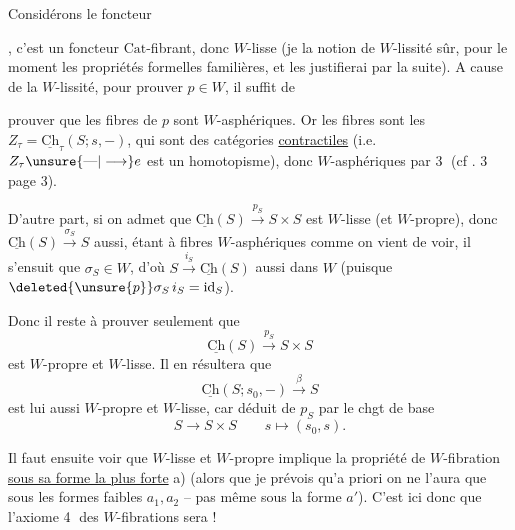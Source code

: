 Considérons le foncteur

, c'est un foncteur $\mathrm{Cat}$-fibrant, donc $W$-lisse (je   la notion de $W$-lissité  sûr,   pour le moment les propriétés formelles familières, et les justifierai par la suite). A cause de la $W$-lissité, pour prouver $p\in W$, il suffit de



prouver que les fibres de $p$ sont $W$-asphériques. Or les fibres sont les $Z_\tau=\underline{\mathrm{Ch}}_\tau(S;s,-)$, qui sont des catégories \uline{contractiles} (i.e. $Z_\tau\unsure{\text{---}|\longrightarrow}e$ est un homotopisme), donc $W$-asphériques par \textcircled{3} (cf . 3 page 3).

D'autre part,  si on admet que $\underline{\mathrm{Ch}}(S)\xrightarrow{p_S}S\times S$ est $W$-lisse (et $W$-propre), donc $\underline{\mathrm{Ch}}(S)\xrightarrow{\sigma_S}S$ aussi, étant à fibres $W$-asphériques comme on vient de voir, il s'ensuit que $\sigma_S\in W$, d'où $S\xrightarrow{i_S}\underline{\mathrm{Ch}}(S)$ aussi dans $W$ (puisque $\deleted{\unsure{p}}\sigma_S\,i_S=\mathrm{id}_S$).


Donc il reste à prouver seulement que
\[
\underline{\mathrm{Ch}}(S)\xrightarrow{p_S}S\times S \tag*{(a)}
\]
est $W$-propre et $W$-lisse. Il en résultera que
\[
\underline{\mathrm{Ch}}(S;s_0,-)\xrightarrow{\beta}S
\]
est lui aussi $W$-propre et $W$-lisse, car déduit de $p_S$ par le chgt de base
\[
S\longrightarrow S\times S\qquad s\longmapsto(s_0,s).
\]

Il faut ensuite voir que  $W$-lisse et $W$-propre implique la propriété de $W$-fibration \uline{sous sa forme la plus forte} a) (alors que je prévois qu'a priori on ne l'aura que sous les formes faibles $a_1,a_2$ -- pas même sous la forme $a'$). C'est ici donc que l'axiome \textcircled{4} des $W$-fibrations sera  !

